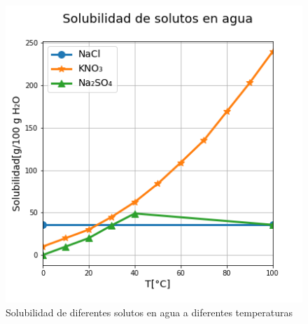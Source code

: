             \begin{figure}
                \centering
                \includegraphics[width=.6\textwidth]{img/graficos/solubilidad_solutos.png}
                \caption{Solubilidad de diferentes solutos en agua a diferentes temperaturas}
                \label{fig:solubilidad_agua}
            \end{figure}
        
            
            \begin{quote}
                \textit{}
            \end{quote}
            
